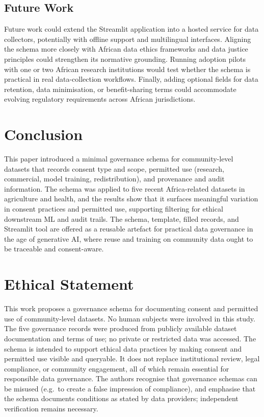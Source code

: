 \documentclass{article}
\begin{document}
\subsection{Future Work}

Future work could extend the Streamlit application into a hosted service for data collectors, potentially with offline support and multilingual interfaces. Aligning the schema more closely with African data ethics frameworks \cite{barrett2025} and data justice principles \cite{munung2025} could strengthen its normative grounding. Running adoption pilots with one or two African research institutions would test whether the schema is practical in real data-collection workflows. Finally, adding optional fields for data retention, data minimisation, or benefit-sharing terms could accommodate evolving regulatory requirements across African jurisdictions.

\section{Conclusion}

This paper introduced a minimal governance schema for community-level datasets that records consent type and scope, permitted use (research, commercial, model training, redistribution), and provenance and audit information. The schema was applied to five recent Africa-related datasets in agriculture and health, and the results show that it surfaces meaningful variation in consent practices and permitted use, supporting filtering for ethical downstream ML and audit trails. The schema, template, filled records, and Streamlit tool are offered as a reusable artefact for practical data governance in the age of generative AI, where reuse and training on community data ought to be traceable and consent-aware.

\section*{Ethical Statement}

This work proposes a governance schema for documenting consent and permitted use of community-level datasets. No human subjects were involved in this study. The five governance records were produced from publicly available dataset documentation and terms of use; no private or restricted data was accessed. The schema is intended to support ethical data practices by making consent and permitted use visible and queryable. It does not replace institutional review, legal compliance, or community engagement, all of which remain essential for responsible data governance. The authors recognise that governance schemas can be misused (e.g.\ to create a false impression of compliance), and emphasise that the schema documents conditions as stated by data providers; independent verification remains necessary.



\end{document}
